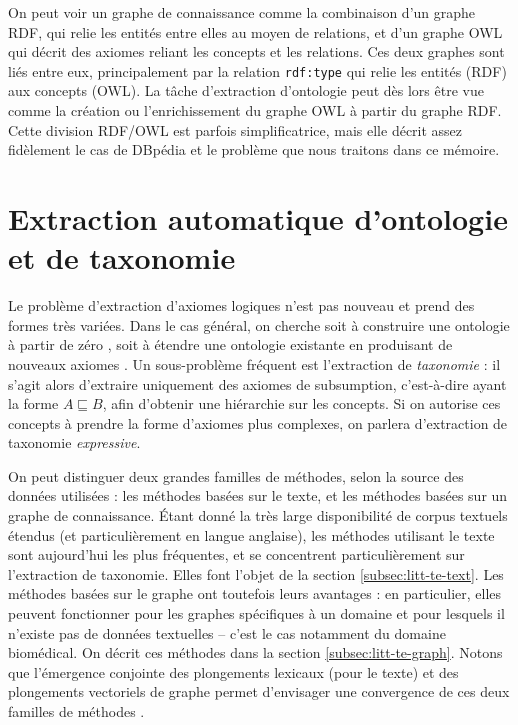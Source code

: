 On peut voir un graphe de connaissance comme la combinaison d'un graphe RDF, qui relie les entités entre elles au moyen de relations, et d'un graphe OWL qui décrit des axiomes reliant les concepts et les relations. Ces deux graphes sont liés entre eux, principalement par la relation \texttt{rdf:type} qui relie les entités (RDF) aux concepts (OWL). La tâche d'extraction d'ontologie peut dès lors être vue comme la création ou l'enrichissement du graphe OWL à partir du graphe RDF. Cette division RDF/OWL est parfois simplificatrice, mais elle décrit assez fidèlement le cas de DBpédia et le problème que nous traitons dans ce mémoire.


\section{Extraction automatique d'ontologie et de taxonomie}



Le problème d'extraction d'axiomes logiques n'est pas nouveau et prend des formes très variées. Dans le cas général, on cherche soit à construire une ontologie à partir de zéro \cite{lehmann2009dl, joinmerge, petrucci2018expressive, sritha2016survey, volker2011statistical}, soit à étendre une ontologie existante en produisant de nouveaux axiomes \cite{li2019ontology, faralli2017contrastmedium, wu2008automatically}. Un sous-problème fréquent est l'extraction de \textit{taxonomie} \cite{petrucci2018expressive, nickel2018learning, atzori2020fully, ristoski2017large}: il s'agit alors d'extraire uniquement des axiomes de subsumption, c'est-à-dire ayant la forme $A \sqsubseteq B$, afin d'obtenir une hiérarchie sur les concepts. Si on autorise ces concepts à prendre la forme d'axiomes plus complexes, on parlera d'extraction de taxonomie \textit{expressive}. 

On peut distinguer deux grandes familles de méthodes, selon la source des données utilisées : les méthodes basées sur le texte, et les méthodes basées sur un graphe de connaissance. Étant donné la très large disponibilité de corpus textuels étendus (et particulièrement en langue anglaise), les méthodes utilisant le texte sont aujourd'hui les plus fréquentes, et se concentrent particulièrement sur l'extraction de taxonomie. Elles font l'objet de la section \ref{subsec:litt-te-text}. Les méthodes basées sur le graphe ont toutefois leurs avantages : en particulier, elles peuvent fonctionner pour les graphes spécifiques à un domaine et pour lesquels il n'existe pas de données textuelles – c'est le cas notamment du domaine biomédical. On décrit ces méthodes dans la section \ref{subsec:litt-te-graph}. Notons que l'émergence conjointe des plongements lexicaux (pour le texte) et des plongements vectoriels de graphe permet d'envisager une convergence de ces deux familles de méthodes \cite{nikolaev2020joint}.


